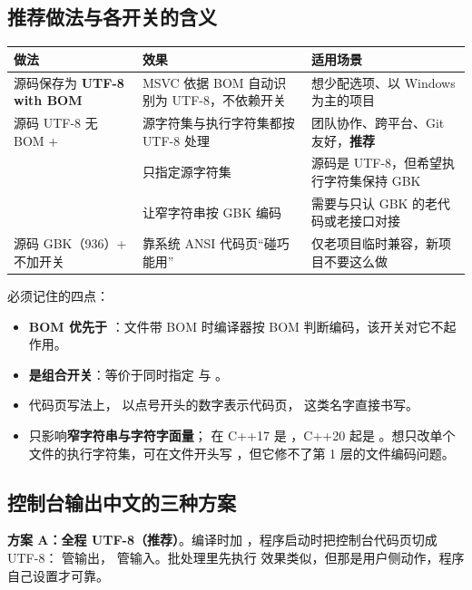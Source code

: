 \subsection{推荐做法与各开关的含义}
\begin{longtable}{L{5.4cm}L{4.6cm}L{4.6cm}}
\toprule
\textbf{做法} & \textbf{效果} & \textbf{适用场景} \\
\midrule
源码保存为 \textbf{UTF-8 with BOM} & MSVC 依据 BOM 自动识别为 UTF-8，不依赖开关 & 想少配选项、以 Windows 为主的项目 \\
源码 UTF-8 无 BOM +  & 源字符集与执行字符集都按 UTF-8 处理 & 团队协作、跨平台、Git 友好，\textbf{推荐} \\
 & 只指定源字符集 & 源码是 UTF-8，但希望执行字符集保持 GBK \\
 & 让窄字符串按 GBK 编码 & 需要与只认 GBK 的老代码或老接口对接 \\
源码 GBK（936）+ 不加开关 & 靠系统 ANSI 代码页“碰巧能用” & 仅老项目临时兼容，新项目不要这么做 \\
\bottomrule
\end{longtable}
必须记住的四点：
\begin{itemize}
  \item \textbf{BOM 优先于 }：文件带 BOM 时编译器按 BOM 判断编码，该开关对它不起作用。
  \item \textbf{ 是组合开关}：等价于同时指定 \allowbreak{} 与 \allowbreak{}。
  \item 代码页写法上， 以点号开头的数字表示代码页， 这类名字直接书写。
  \item {} 只影响\textbf{窄字符串与字符字面量}； 在 C++17 是 ，C++20 起是 。想只改单个文件的执行字符集，可在文件开头写 ，但它修不了第 1 层的文件编码问题。
\end{itemize}
\subsection{控制台输出中文的三种方案}
\textbf{方案 A：全程 UTF-8（推荐）}。编译时加 ，程序启动时把控制台代码页切成 UTF-8： 管输出， 管输入。批处理里先执行  效果类似，但那是用户侧动作，程序自己设置才可靠。

